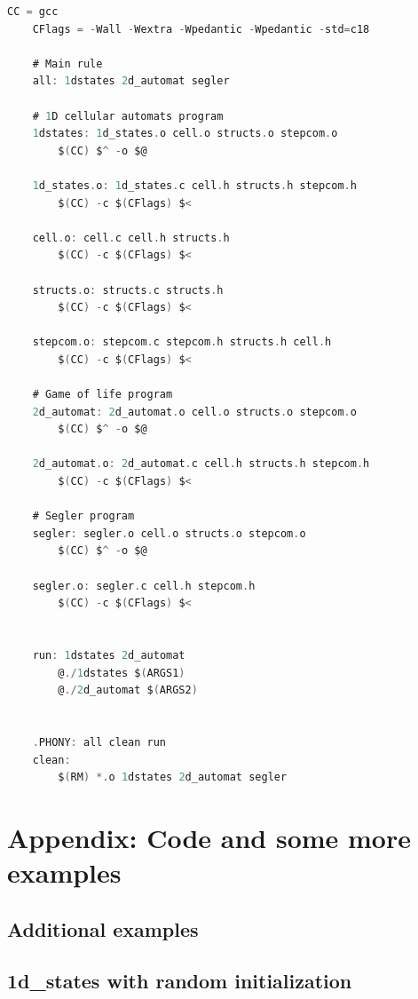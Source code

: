 \documentclass[12pt,a4paper]{article}
\begin{document}
\begin{lstlisting}[caption={\small Makefile},label={lst:p7001},basicstyle=\ttfamily\tiny,language=C]
    CC = gcc
    CFlags = -Wall -Wextra -Wpedantic -Wpedantic -std=c18

    # Main rule
    all: 1dstates 2d_automat segler

    # 1D cellular automats program
    1dstates: 1d_states.o cell.o structs.o stepcom.o
        $(CC) $^ -o $@

    1d_states.o: 1d_states.c cell.h structs.h stepcom.h
        $(CC) -c $(CFlags) $<

    cell.o: cell.c cell.h structs.h
        $(CC) -c $(CFlags) $<

    structs.o: structs.c structs.h
        $(CC) -c $(CFlags) $<

    stepcom.o: stepcom.c stepcom.h structs.h cell.h
        $(CC) -c $(CFlags) $<

    # Game of life program
    2d_automat: 2d_automat.o cell.o structs.o stepcom.o
        $(CC) $^ -o $@

    2d_automat.o: 2d_automat.c cell.h structs.h stepcom.h
        $(CC) -c $(CFlags) $<

    # Segler program
    segler: segler.o cell.o structs.o stepcom.o
        $(CC) $^ -o $@

    segler.o: segler.c cell.h stepcom.h
        $(CC) -c $(CFlags) $<


    run: 1dstates 2d_automat
        @./1dstates $(ARGS1)
        @./2d_automat $(ARGS2)


    .PHONY: all clean run
    clean:
        $(RM) *.o 1dstates 2d_automat segler
\end{lstlisting}


\newpage


\section{Appendix: Code and some more examples}
\vspace{1cm}


\subsection{Additional examples}
\vspace{0.1cm}

\subsection*{\small 1d\_states with random initialization}
\end{document}

